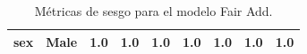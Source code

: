 \documentclass[oneside,openright,titlepage,numbers=noenddot,openany,headinclude,footinclude=true,
cleardoublepage=empty,abstractoff,BCOR=5mm,paper=a4,fontsize=12pt,main=spanish]{scrreprt}
\begin{document}
\begin{table}[H]
{\begin{tabular}{|c|c|c|c|c|c|c|c|c|}
\textbf{sex}                                                      & Male                                                               & {\color[HTML]{3166FF} 1.0}                                       & {\color[HTML]{3166FF} 1.0}                                       & {\color[HTML]{3166FF} 1.0}                                       & {\color[HTML]{3166FF} 1.0}                                       & {\color[HTML]{3166FF} 1.0}                                       & {\color[HTML]{3166FF} 1.0}                                       & {\color[HTML]{3166FF} 1.0}                                       \\ \hline
\end{tabular}
}
\caption{Métricas de sesgo para el modelo Fair Add.}
\label{tab:sesgofairadd}
\end{table}
\end{document}
